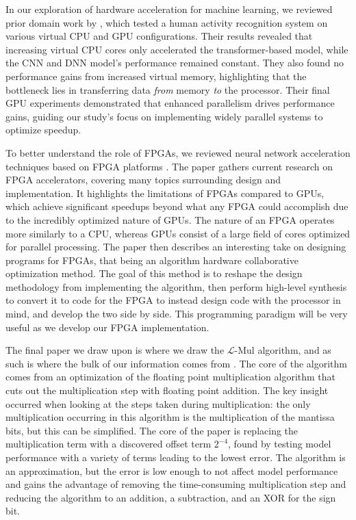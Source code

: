 \documentclass[12pt,letterpaper]{article}
\newcommand{\lmul}{$\mathcal{L}$-Mul\xspace}
\begin{document}
In our exploration of hardware acceleration for machine learning, we reviewed prior domain work by \citep{b182023}, which tested a human activity recognition system on various virtual CPU and GPU configurations. Their results revealed that increasing virtual CPU cores only accelerated the transformer-based model, while the CNN and DNN model’s performance remained constant. They also found no performance gains from increased virtual memory, highlighting that the bottleneck lies in transferring data \textit{from} memory \textit{to} the processor. Their final GPU experiments demonstrated that enhanced parallelism drives performance gains, guiding our study's focus on implementing widely parallel systems to optimize speedup.

To better understand the role of FPGAs, we reviewed neural network acceleration techniques based on FPGA platforms \citep{liu2024review}. The paper gathers current research on FPGA accelerators, covering many topics surrounding design and implementation. It highlights the limitations of FPGAs compared to GPUs, which achieve significant speedups beyond what any FPGA could accomplish due to the incredibly optimized nature of GPUs. The nature of an FPGA operates more similarly to a CPU, whereas GPUs consist of a large field of cores optimized for parallel processing. The paper then describes an interesting take on designing programs for FPGAs, that being an algorithm hardware collaborative optimization method. The goal of this method is to reshape the design methodology from implementing the algorithm, then perform high-level synthesis to convert it to code for the FPGA to instead design code with the processor in mind, and develop the two side by side. This programming paradigm will be very useful as we develop our FPGA implementation.

The final paper we draw upon is where we draw the \lmul algorithm, and as such is where the bulk of our information comes from \citep{luo2024addition}. The core of the algorithm comes from an optimization of the floating point multiplication algorithm that cuts out the multiplication step with floating point addition. The key insight occurred when looking at the steps taken during multiplication: the only multiplication occurring in this algorithm is the multiplication of the mantissa bits, but this can be simplified. The core of the paper is replacing the multiplication term with a discovered offset term $2^{-4}$, found by testing model performance with a variety of terms leading to the lowest error. The algorithm is an approximation, but the error is low enough to not affect model performance and gains the advantage of removing the time-consuming multiplication step and reducing the algorithm to an addition, a subtraction, and an XOR for the sign bit.
\end{document}

